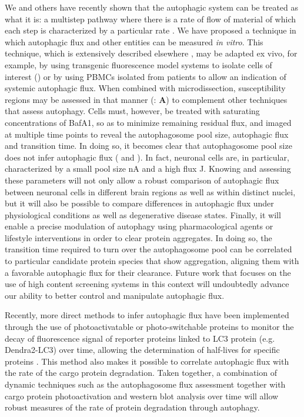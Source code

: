 We and others have recently shown that the autophagic system can be treated as what it is: a multistep pathway where there is a rate of flow of material of which each step is characterized by a particular rate \citep{Meijer2009,loos2014}. We have proposed a technique in which autophagic flux and other entities can be measured \textit{in vitro}. This technique, which is extensively described elsewhere \citep{loos2014}, may be adapted ex vivo, for example, by using transgenic fluorescence model systems \citep{Mizushima2004a} to isolate cells of interest () or by using PBMCs isolated from patients \citep{Rangwala2014} to allow an indication of systemic autophagic flux. When combined with microdissection, susceptibility regions may be assessed in that manner (: \textbf{A}) to complement other techniques that assess autophagy. Cells must, however, be treated with saturating concentrations of BafA1, so as to minimize remaining residual flux, and imaged at multiple time points to reveal the autophagosome pool size, autophagic flux and transition time. In doing so, it becomes clear that autophagosome pool size does not infer autophagic flux ( and ). In fact, neuronal cells are, in particular, characterized by a small pool size nA and a high flux J. Knowing and assessing these parameters will not only allow a robust comparison of autophagic flux between neuronal cells in different brain regions as well as within distinct nuclei, but it will also be possible to compare differences in autophagic flux under physiological conditions as well as degenerative disease states. Finally, it will enable a precise modulation of autophagy using pharmacological agents or lifestyle interventions in order to clear protein aggregates. In doing so, the transition time required to turn over the autophagosome pool can be correlated to particular candidate protein species that show aggregation, aligning them with a favorable autophagic flux for their clearance. Future work that focuses on the use of high content screening systems in this context will undoubtedly advance our ability to better control and manipulate autophagic flux. 

Recently, more direct methods to infer autophagic flux have been implemented through the use of photoactivatable or photo-switchable proteins to monitor the decay of fluorescence signal of reporter proteins linked to LC3 protein (e.g. Dendra2-LC3) over time, allowing the determination of half-lives for specific proteins \citep{Tsvetkov2013}. This method also makes it possible to correlate autophagic flux with the rate of the cargo protein degradation. Taken together, a combination of dynamic techniques such as the autophagosome flux assessment together with cargo protein photoactivation and western blot analysis over time will allow robust measures of the rate of protein degradation through autophagy.

